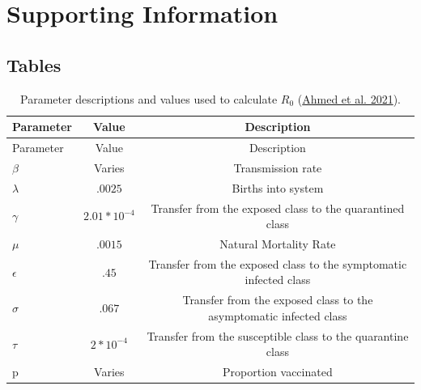 \documentclass[
  12pt,
]{article}
\begin{document}
\clearpage

\setcounter{page}{0}
\setcounter{page}{1}

\setcounter{figure}{0}
\setcounter{table}{0}
\renewcommand {\thetable}{S\arabic{table}}
\renewcommand {\thefigure}{S\arabic{figure}}

\hypertarget{supporting-information}{%
\section{Supporting Information}\label{supporting-information}}

\hypertarget{tables}{%
\subsection{Tables}\label{tables}}

\begin{longtable}[]{@{}lcc@{}}
\caption{\label{tab:suptable1} Parameter descriptions and values used to calculate \(R_0\) (\protect\hyperlink{ref-ahmed_mathematical_2021}{Ahmed et al. 2021}).}\tabularnewline
\toprule
Parameter & Value & Description \\
\midrule
\endfirsthead
\toprule
Parameter & Value & Description \\
\midrule
\endhead
\(\beta\) & Varies & Transmission rate \\
\(\lambda\) & \(.0025\) & Births into system \\
\(\gamma\) & \(2.01*10^{-4}\) & Transfer from the exposed class to the quarantined class \\
\(\mu\) & \(.0015\) & Natural Mortality Rate \\
\(\epsilon\) & \(.45\) & Transfer from the exposed class to the symptomatic infected class \\
\(\sigma\) & \(.067\) & Transfer from the exposed class to the asymptomatic infected class \\
\(\tau\) & \(2*10^{-4}\) & Transfer from the susceptible class to the quarantine class \\
p & Varies & Proportion vaccinated \\
\bottomrule
\end{longtable}
\end{document}
